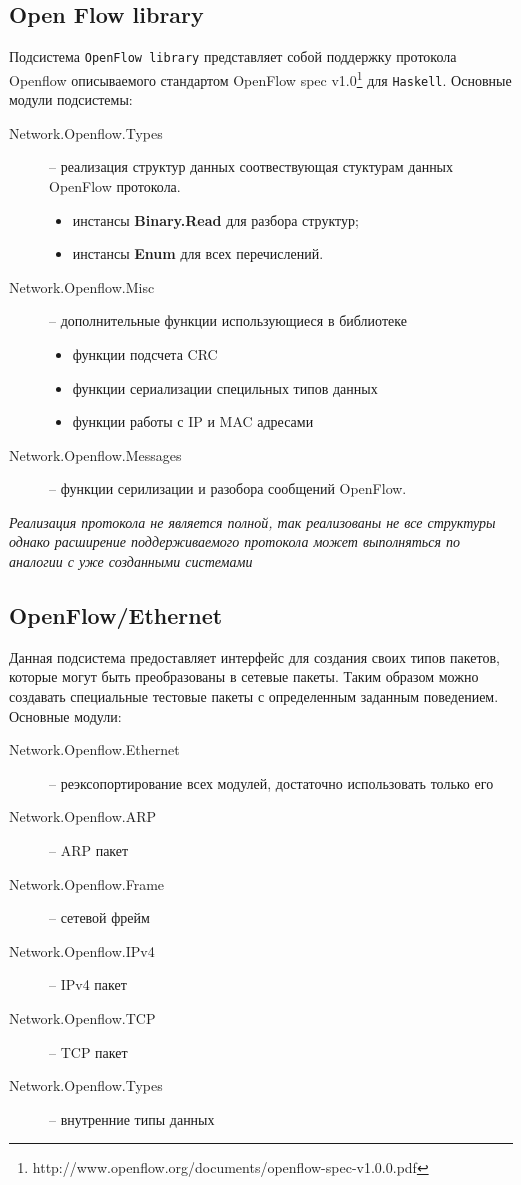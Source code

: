 \documentclass[9pt,a4paper]{article}
\begin{document}
\subsection{Open Flow library}

Подсистема \texttt{OpenFlow library} представляет собой поддержку протокола 
Openflow описываемого стандартом OpenFlow spec 
v1.0\footnote{http://www.openflow.org/documents/openflow-spec-v1.0.0.pdf}
для \texttt{Haskell}. Основные модули подсистемы:

\begin{description}
    \item[Network.Openflow.Types] -- реализация структур данных соотвествующая
        стуктурам данных OpenFlow протокола.
        \begin{itemize}
            \item инстансы \textbf{Binary.Read} для разбора структур;
            \item инстансы \textbf{Enum} для всех перечислений.
        \end{itemize}
    \item[Network.Openflow.Misc] -- дополнительные функции использующиеся в библиотеке
        \begin{itemize}
            \item функции подсчета CRC
            \item функции сериализации специльных типов данных
            \item функции работы с IP и MAC адресами
        \end{itemize}
    \item[Network.Openflow.Messages] -- функции серилизации и разобора сообщений OpenFlow.
\end{description}

{\emph{Реализация протокола не является полной, так реализованы не все структуры
однако расширение поддерживаемого протокола может выполняться по аналогии с
уже созданными системами}}

\subsection{OpenFlow/Ethernet}

Данная подсистема предоставляет интерфейс для создания своих типов пакетов, 
которые могут быть преобразованы в сетевые пакеты. Таким образом можно создавать
специальные тестовые пакеты с определенным заданным поведением. Основные модули:

\begin{description}
  \item[Network.Openflow.Ethernet] -- реэксопортирование всех модулей, достаточно использовать только его
  \item[Network.Openflow.ARP] -- ARP пакет
  \item[Network.Openflow.Frame] -- сетевой фрейм
  \item[Network.Openflow.IPv4]  -- IPv4 пакет
  \item[Network.Openflow.TCP]   -- TCP пакет
  \item[Network.Openflow.Types] -- внутренние типы данных
\end{description}
\end{document}
